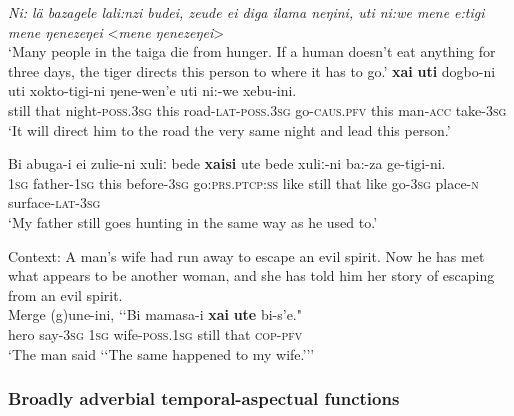 \begin{exe}
	\ex \textit{Ni: lä bazagele lali:nzi budei, zeude ei diga ilama neŋini, uti ni:we mene e:tigi mene ŋenezeŋei} <\textit{mene ŋenezeŋei}>\\
	\lq Many people in the taiga die from hunger. If a human doesn’t eat anything for three days, the tiger directs this person to where it has to go.'
	\exi{}
	\gll \textbf{xai} \textbf{uti} dogbo-ni uti xokto-tigi-ni ŋene-wen’e uti ni:-we xebu-ini.\\
still that night-\textsc{poss}.3\textsc{sg} this road-\textsc{lat}-\textsc{poss}.3\textsc{sg} go-\textsc{caus}.\textsc{pfv} this man-\textsc{acc} take-3\textsc{sg}\\
\glt \lq It will direct him to the road the very same night and lead this person.' \parencite[The tiger for Udihe people]{NikolaevaEtAl2019}

	\ex\label{exAppendixUdiheSame2}
	\gll Bi abuga-i ei zulie-ni xuliː bede \textbf{xaisi} ute bede xuliː-ni ba:-za ge-tigi-ni.\\
1\textsc{sg} father-1\textsc{sg} this before-3\textsc{sg} go:\textsc{prs}.\textsc{ptcp}:\textsc{ss} like still that like go-3\textsc{sg} place-\textsc{n} surface-\textsc{lat}-3\textsc{sg}\\
\glt \lq My father still goes hunting in the same way as he used to.\rq{ }\parencite[398–399]{NikolaevaTolskaya2001}


	\ex\label{exAppendixUdiheSame3}
	Context: A man's wife had run away to escape an evil spirit. Now he has met what appears to be another woman, and she has told him her story of escaping from an evil spirit. \\
	\gll  Merge (g)une-ini, \lq\lq Bi mamasa-i \textbf{xai} \textbf{ute} bi-s’e."\\
	hero say-3\textsc{sg} \phantom{\lq\lq}1\textsc{sg} wife-\textsc{poss}.1\textsc{sg} still that \textsc{cop}-\textsc{pfv}\\
	\glt \lq The man said \lq\lq The same happened to my wife.{\rq\rq}\rq{ }\parencite[76–77]{NikolaevaEtAl2003}
\end{exe}


\subsubsection{Broadly adverbial temporal-aspectual functions}
